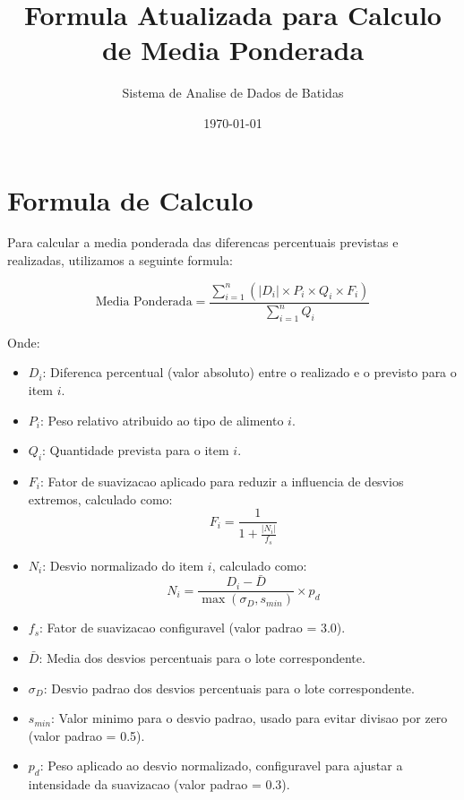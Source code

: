 \documentclass{article}
\title{Formula Atualizada para Calculo de Media Ponderada}
\author{Sistema de Analise de Dados de Batidas}
\date{\today}
\begin{document}
\maketitle

\section*{Formula de Calculo}

Para calcular a media ponderada das diferencas percentuais previstas e realizadas, utilizamos a seguinte formula:

\begin{equation}
    \text{Media Ponderada} = \frac{\sum_{i=1}^{n} \left( |D_i| \times P_i \times Q_i \times F_i \right)}{\sum_{i=1}^{n} Q_i}
\end{equation}

Onde:

\begin{itemize}
    \item $D_i$: Diferenca percentual (valor absoluto) entre o realizado e o previsto para o item $i$.
    \item $P_i$: Peso relativo atribuido ao tipo de alimento $i$.
    \item $Q_i$: Quantidade prevista para o item $i$.
    \item $F_i$: Fator de suavizacao aplicado para reduzir a influencia de desvios extremos, calculado como:
    \begin{equation}
        F_i = \frac{1}{1 + \frac{|N_i|}{f_s}}
    \end{equation}
    \item $N_i$: Desvio normalizado do item $i$, calculado como:
    \begin{equation}
        N_i = \frac{D_i - \bar{D}}{\max(\sigma_D, s_{min})} \times p_d
    \end{equation}
    \item $f_s$: Fator de suavizacao configuravel (valor padrao = 3.0).
    \item $\bar{D}$: Media dos desvios percentuais para o lote correspondente.
    \item $\sigma_D$: Desvio padrao dos desvios percentuais para o lote correspondente.
    \item $s_{min}$: Valor minimo para o desvio padrao, usado para evitar divisao por zero (valor padrao = 0.5).
    \item $p_d$: Peso aplicado ao desvio normalizado, configuravel para ajustar a intensidade da suavizacao (valor padrao = 0.3).
\end{itemize}
\end{document}
